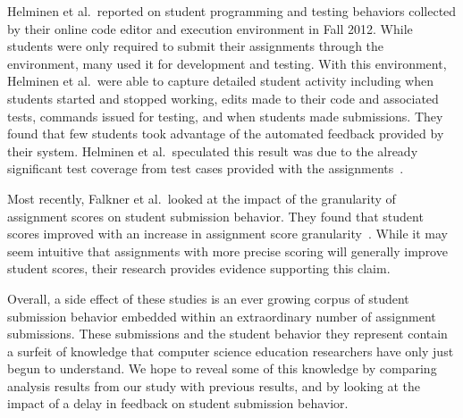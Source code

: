 Helminen et al.\ reported on student programming and testing behaviors
collected by their online code editor and execution environment in Fall
2012. While students were only required to submit their assignments through the
environment, many used it for development and testing. With this environment,
Helminen et al.\ were able to capture detailed student activity including when
students started and stopped working, edits made to their code and associated
tests, commands issued for testing, and when students made submissions. They
found that few students took advantage of the automated feedback provided by
their system. Helminen et al.\ speculated this result was due to the already
significant test coverage from test cases provided with the
assignments~\cite{Helminen:2013:RAI:2526968.2526970}.

Most recently, Falkner et al.\ looked at the impact of the granularity of
assignment scores on student submission behavior. They found that student
scores improved with an increase in assignment score
granularity~\cite{Falkner:2014:IEA:2538862.2538896}. While it may seem
intuitive that assignments with more precise scoring will generally improve
student scores, their research provides evidence supporting this claim.

Overall, a side effect of these studies is an ever growing corpus of student
submission behavior embedded within an extraordinary number of assignment
submissions. These submissions and the student behavior they represent contain
a surfeit of knowledge that computer science education researchers have only
just begun to understand. We hope to reveal some of this knowledge by comparing
analysis results from our study with previous results, and by looking at the
impact of a delay in feedback on student submission behavior.
